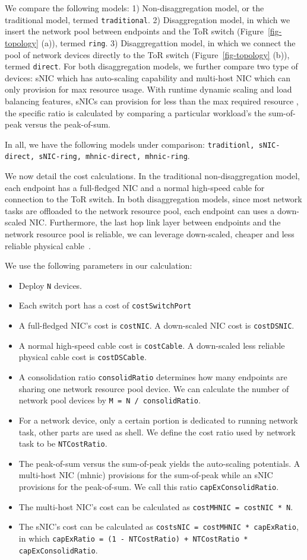 We compare the following models:
1) Non-disaggregation model, or the traditional model, termed \texttt{traditional}.
2) Disaggregation model, in which we insert the network pool between endpoints and the ToR switch (Figure~\ref{fig-topology} (a)), termed \texttt{ring}.
3) Disaggregattion model, in which we connect the pool of network devices directly to the ToR switch (Figure~\ref{fig-topology} (b)), termed \texttt{direct}.
For both disaggregation models, we further compare two type of devices: sNIC which has auto-scaling capability and multi-host NIC which can only provision for max resource usage. With runtime dynamic scaling and load balancing features, sNICs can provision for less than the max required resource , the specific ratio is calculated by comparing a particular workload's the sum-of-peak versus the peak-of-sum.

In all, we have the following models under comparison:
\texttt{traditionl, sNIC-direct, sNIC-ring, mhnic-direct, mhnic-ring}.

We now detail the cost calculations.
In the traditional non-disaggregation model,
each endpoint has a full-fledged NIC and a normal high-speed cable for connection to the ToR switch.
In both disaggregation models, since most network tasks are offloaded to the network resource pool, each endpoint can uses a down-scaled NIC.
Furthermore, the last hop link layer between endpoints and the network resource pool is reliable, we can leverage down-scaled, cheaper and less reliable physical cable~\cite{RAIL-NSDI}.

We use the following parameters in our calculation:
\begin{itemize}
\item Deploy \texttt{N} devices.
\item Each switch port has a cost of \texttt{costSwitchPort}
\item A full-fledged NIC's cost is \texttt{costNIC}. A down-scaled NIC cost is \texttt{costDSNIC}.
\item A normal high-speed cable cost is \texttt{costCable}.
A down-scaled less reliable physical cable cost is \texttt{costDSCable}.
\item A consolidation ratio \texttt{consolidRatio} determines how many endpoints are sharing one network resource pool device. We can calculate the number of network pool devices by \texttt{M = N / consolidRatio}.
\item For a network device, only a certain portion is dedicated to running network task, other parts are used as shell. We define the cost ratio used by network task to be \texttt{NTCostRatio}.
\item The peak-of-sum versus the sum-of-peak yields the auto-scaling potentials. A multi-host NIC (mhnic) provisions for the sum-of-peak while an sNIC provisions for the peak-of-sum. We call this ratio \texttt{capExConsolidRatio}.
\item The multi-host NIC's cost can be calculated as \texttt{costMHNIC = costNIC * N}.
\item The sNIC's cost can be calculated as \texttt{costsNIC = costMHNIC * capExRatio}, in which \texttt{capExRatio = (1 - NTCostRatio) + NTCostRatio * capExConsolidRatio}.
\end{itemize}

